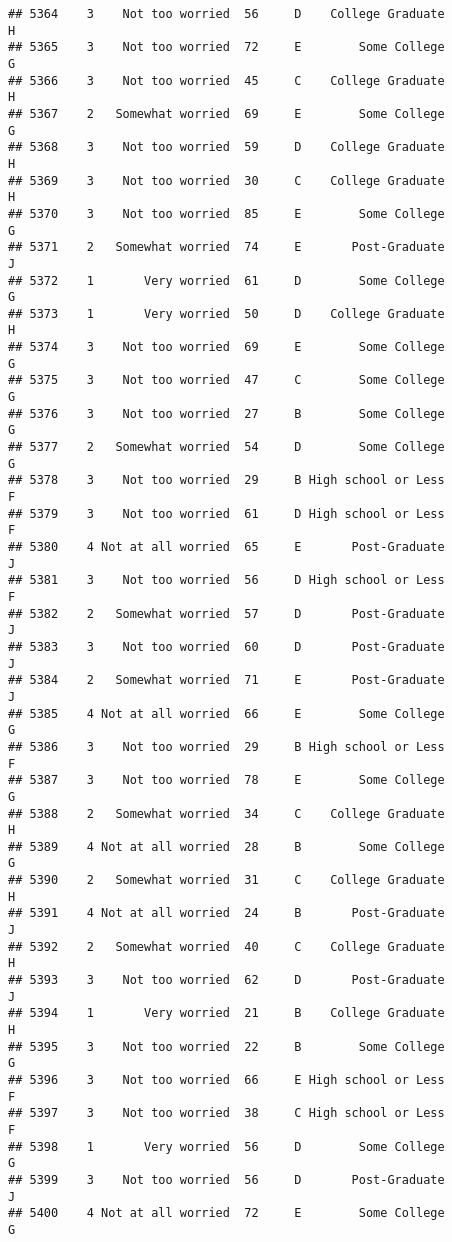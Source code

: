 \documentclass[
]{article}
\begin{document}
\begin{verbatim}
## 5364    3    Not too worried  56     D    College Graduate         H
## 5365    3    Not too worried  72     E        Some College         G
## 5366    3    Not too worried  45     C    College Graduate         H
## 5367    2   Somewhat worried  69     E        Some College         G
## 5368    3    Not too worried  59     D    College Graduate         H
## 5369    3    Not too worried  30     C    College Graduate         H
## 5370    3    Not too worried  85     E        Some College         G
## 5371    2   Somewhat worried  74     E       Post-Graduate         J
## 5372    1       Very worried  61     D        Some College         G
## 5373    1       Very worried  50     D    College Graduate         H
## 5374    3    Not too worried  69     E        Some College         G
## 5375    3    Not too worried  47     C        Some College         G
## 5376    3    Not too worried  27     B        Some College         G
## 5377    2   Somewhat worried  54     D        Some College         G
## 5378    3    Not too worried  29     B High school or Less         F
## 5379    3    Not too worried  61     D High school or Less         F
## 5380    4 Not at all worried  65     E       Post-Graduate         J
## 5381    3    Not too worried  56     D High school or Less         F
## 5382    2   Somewhat worried  57     D       Post-Graduate         J
## 5383    3    Not too worried  60     D       Post-Graduate         J
## 5384    2   Somewhat worried  71     E       Post-Graduate         J
## 5385    4 Not at all worried  66     E        Some College         G
## 5386    3    Not too worried  29     B High school or Less         F
## 5387    3    Not too worried  78     E        Some College         G
## 5388    2   Somewhat worried  34     C    College Graduate         H
## 5389    4 Not at all worried  28     B        Some College         G
## 5390    2   Somewhat worried  31     C    College Graduate         H
## 5391    4 Not at all worried  24     B       Post-Graduate         J
## 5392    2   Somewhat worried  40     C    College Graduate         H
## 5393    3    Not too worried  62     D       Post-Graduate         J
## 5394    1       Very worried  21     B    College Graduate         H
## 5395    3    Not too worried  22     B        Some College         G
## 5396    3    Not too worried  66     E High school or Less         F
## 5397    3    Not too worried  38     C High school or Less         F
## 5398    1       Very worried  56     D        Some College         G
## 5399    3    Not too worried  56     D       Post-Graduate         J
## 5400    4 Not at all worried  72     E        Some College         G

\end{verbatim}
\end{document}
